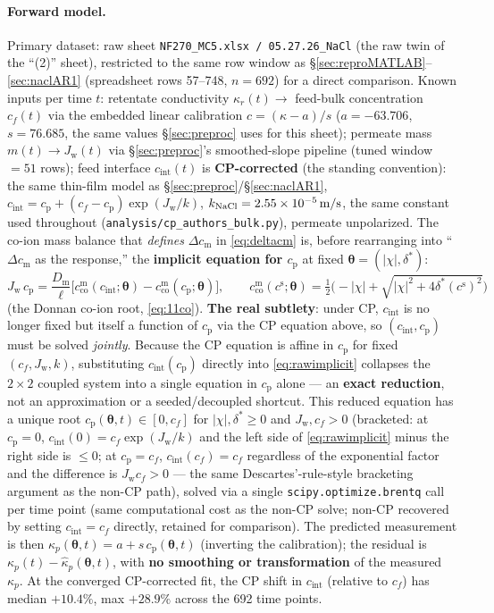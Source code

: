 \documentclass[11pt]{article}
\newcommand{\cm}[1]{{c^{\mathrm{m}}_{#1}}}
\newcommand{\co}{\mathrm{co}}
\newcommand{\Jw}{J_{\mathrm{w}}}
\newcommand{\dstar}{\delta^{*}}
\newcommand{\Dm}{D_{\mathrm{m}}}
\newcommand{\cint}{c_{\mathrm{int}}}
\newcommand{\cp}{c_{\mathrm{p}}}
\begin{document}
\paragraph{Forward model.} Primary dataset: raw sheet \texttt{NF270\_MC5.xlsx
/ 05.27.26\_NaCl} (the raw twin of the ``(2)'' sheet), restricted to the same
row window as \S\ref{sec:reproMATLAB}--\ref{sec:naclAR1} (spreadsheet rows
57--748, $n=692$) for a direct comparison. Known inputs per time $t$:
retentate conductivity $\kappa_r(t)\to$ feed-bulk concentration $c_f(t)$ via
the embedded linear calibration $c=(\kappa-a)/s$ ($a=-63.706$, $s=76.685$,
the same values \S\ref{sec:preproc} uses for this sheet); permeate mass
$m(t)\to\Jw(t)$ via \S\ref{sec:preproc}'s smoothed-slope pipeline (tuned
window $=51$ rows); feed interface $\cint(t)$ is \textbf{CP-corrected}
(the standing convention): the same thin-film model as
\S\ref{sec:preproc}/\S\ref{sec:naclAR1}, $\cint=\cp+(c_f-\cp)\exp(\Jw/k)$,
$k_{\ce{NaCl}}=\SI{2.55e-5}{m/s}$, the same constant used throughout
(\texttt{analysis/cp\_authors\_bulk.py}), permeate unpolarized. The co-ion
mass balance that \emph{defines} $\Delta c_{\mathrm m}$ in \eqref{eq:deltacm}
is, before rearranging into ``$\Delta c_{\mathrm m}$ as the response,'' the
\textbf{implicit equation for $\cp$} at fixed $\boldsymbol\theta=(|\chi|,\dstar)$:
\begin{equation}
  \Jw\,\cp = \frac{\Dm}{\ell}\Big[\cm{\co}(\cint;\boldsymbol\theta) - \cm{\co}(\cp;\boldsymbol\theta)\Big],
  \qquad
  \cm{\co}(c^{\mathrm s};\boldsymbol\theta) = \tfrac12\big(-|\chi|+\sqrt{|\chi|^2+4\dstar (c^{\mathrm s})^2}\big)
  \label{eq:rawimplicit}
\end{equation}
(the Donnan co-ion root, \eqref{eq:11co}). \textbf{The real subtlety}: under
CP, $\cint$ is no longer fixed but itself a function of $\cp$ via the CP
equation above, so $(\cint,\cp)$ must be solved \emph{jointly}. Because the
CP equation is affine in $\cp$ for fixed $(c_f,\Jw,k)$, substituting
$\cint(\cp)$ directly into \eqref{eq:rawimplicit} collapses the $2\times2$
coupled system into a single equation in $\cp$ alone --- an \textbf{exact
reduction}, not an approximation or a seeded/decoupled shortcut. This
reduced equation has a unique root $\cp(\boldsymbol\theta,t)\in[0,c_f]$ for
$|\chi|,\dstar\ge0$ and $\Jw,c_f>0$ (bracketed: at $\cp=0$,
$\cint(0)=c_f\exp(\Jw/k)$ and the left side of \eqref{eq:rawimplicit} minus
the right side is $\le0$; at $\cp=c_f$, $\cint(c_f)=c_f$ regardless of the
exponential factor and the difference is $\Jw c_f>0$ --- the same
Descartes'-rule-style bracketing argument as the non-CP path), solved via a
single \texttt{scipy.optimize.brentq} call per time point (same
computational cost as the non-CP solve; non-CP recovered by setting
$\cint=c_f$ directly, retained for comparison). The predicted measurement is
then $\hat\kappa_p(\boldsymbol\theta,t)=a+s\,\cp(\boldsymbol\theta,t)$ (inverting the
calibration); the residual is $\kappa_p(t)-\hat\kappa_p(\boldsymbol\theta,t)$,
with \textbf{no smoothing or transformation} of the measured $\kappa_p$. At
the converged CP-corrected fit, the CP shift in $\cint$ (relative to $c_f$)
has median $+10.4\%$, max $+28.9\%$ across the 692 time points.
\end{document}
